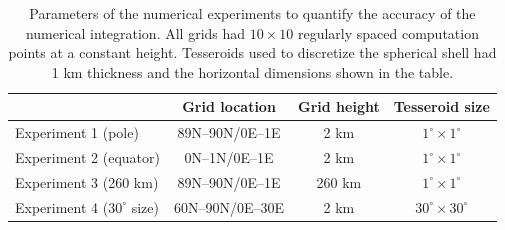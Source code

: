 \begin{table}
\centering
\begin{tabular}{lccc}
    \hline
    ~             & Grid location & Grid height & Tesseroid size \\
    \hline
    Experiment 1 (pole)            & 89N--90N/0E--1E  & 2 km   & $1^\circ \times 1^\circ$ \\
    Experiment 2 (equator)         & 0N--1N/0E--1E    & 2 km   & $1^\circ \times 1^\circ$ \\
    Experiment 3 (260 km)          & 89N--90N/0E--1E  & 260 km & $1^\circ \times 1^\circ$ \\
    Experiment 4 ($30^\circ$ size) & 60N--90N/0E--30E & 2 km   & $30^\circ \times 30^\circ$ \\
    \hline
\end{tabular}
\caption{
    Parameters of the numerical experiments to quantify the accuracy of
    the numerical integration.
    All grids had $10\times10$ regularly spaced computation points at a
    constant height.
    Tesseroids used to discretize the spherical shell had 1 km thickness and
    the horizontal dimensions shown in the table.
}
\label{tbl:experiment}
\end{table}


